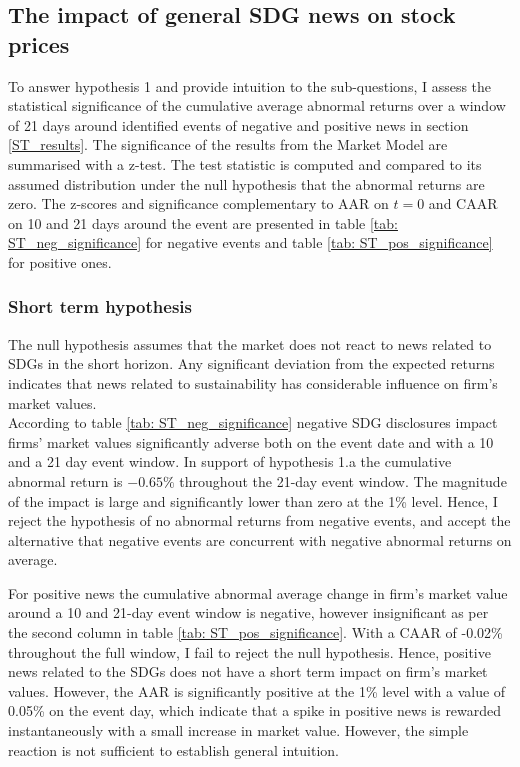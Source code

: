 

\subsection{The impact of general SDG news on stock prices} \label{sec: short_term_analysis}

To answer hypothesis 1 and provide intuition to the sub-questions, I assess the statistical significance of the cumulative average abnormal returns over a window of 21 days around identified events of negative and positive news in section \ref{ST_results}.  
The significance of the results from the Market Model are summarised with a z-test. The test statistic is computed and compared to its assumed distribution under the null hypothesis that the abnormal returns are zero. The z-scores and significance complementary to AAR on $t=0$ and CAAR on 10 and 21 days around the event are presented in table \ref{tab: ST_neg_significance} for negative events and table \ref{tab: ST_pos_significance} for positive ones.  

\subsubsection{Short term hypothesis}

The null hypothesis assumes that the market does not react to news related to SDGs in the short horizon. Any significant deviation from the expected returns indicates that news related to sustainability has considerable influence on firm's market values.  \\
 
According to table \ref{tab: ST_neg_significance} negative SDG disclosures impact firms' market values significantly adverse both on the event date and with a 10 and a 21 day event window. In support of hypothesis 1.a the cumulative abnormal return is $-0.65\%$ throughout the 21-day event window. The magnitude of the impact is large and significantly lower than zero at the 1\% level. Hence, I reject the hypothesis of no abnormal returns from negative events, and accept the alternative that negative events are concurrent with negative abnormal returns on average. 

For positive news the cumulative abnormal average change in firm's market value around a 10 and 21-day event window is negative, however insignificant as per the second column in table \ref{tab: ST_pos_significance}. With a CAAR of -0.02\% throughout the full window, I fail to reject the null hypothesis. Hence, positive news related to the SDGs does not have a short term impact on firm's market values. However, the AAR is significantly positive at the 1\% level with a value of 0.05\% on the event day, which indicate that a spike in positive news is rewarded instantaneously with a small increase in market value. However, the simple reaction is not sufficient to establish general intuition.

